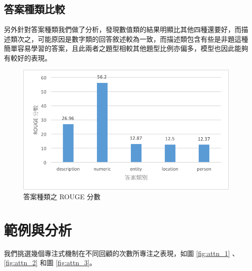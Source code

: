 \subsection{答案種類比較}
另外針對答案種類我們做了分析，發現數值類的結果明顯比其他四種還要好，而描述類次之，可能原因是數字類的回答敘述較為一致，而描述類包含有些是非題這種簡單容易學習的答案，且此兩者之題型相較其他題型比例亦偏多，模型也因此能夠有較好的表現。%
\begin{figure}
    \centering
    \includegraphics[scale=0.7]{images/chap3_rouge_dist.png}
    \caption{答案種類之 ROUGE 分數}
    \label{fig:rouge_dist}
\end{figure}
\section{範例與分析}
我們挑選幾個專注式機制在不同回顧的次數所專注之表現，如圖 \ref{fig:attn_1} 、 \ref{fig:attn_2} 和圖 \ref{fig:attn_3}。

